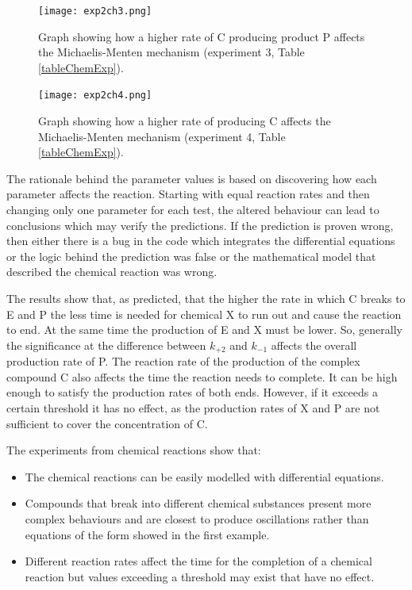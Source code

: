 \begin{figure}
\centering
\texttt{[image: exp2ch3.png]}
\caption{Graph showing how a higher rate of C producing product P affects the Michaelis-Menten mechanism (experiment 3, Table \ref{tableChemExp}).}
\label{exp2ch3}
\end{figure}

\begin{figure}
\centering
\texttt{[image: exp2ch4.png]}
\caption{Graph showing how a higher rate of producing C affects the Michaelis-Menten mechanism (experiment 4, Table \ref{tableChemExp}).}
\label{exp2ch4}
\end{figure}

The rationale behind the parameter values is based on discovering how each parameter affects the reaction. Starting with equal reaction rates and then changing only one parameter for each test, the altered behaviour can lead to conclusions which may verify the predictions. If the prediction is proven wrong, then either there is a bug in the code which integrates the differential equations or the logic behind the prediction was false or the mathematical model that described the chemical reaction was wrong.

The results show that, as predicted, that the higher the rate in which C breaks to E and P the less time is needed for chemical X to run out and cause the reaction to end. At the same time the production of E and X must be lower. So, generally the significance at the difference between $ k_{+2} $ and $ k_{-1} $ affects the overall production rate of P. The reaction rate of the production of the complex compound C also affects the time the reaction needs to complete. It can be high enough to satisfy the production rates of both ends. However, if it exceeds a certain threshold it has no effect, as the production rates of X and P are not sufficient to cover the concentration of C. 

The experiments from chemical reactions show that:
\begin{itemize}
\item The chemical reactions can be easily modelled with differential equations.
\item Compounds that break into different chemical substances present more complex behaviours and are closest to produce oscillations rather than equations of the form showed in the first example.
\item Different reaction rates affect the time for the completion of a chemical reaction but values exceeding a threshold may exist that have no effect.
\end{itemize}
   

